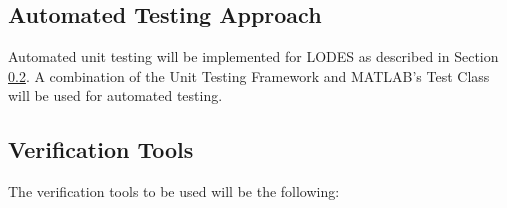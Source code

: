 \documentclass[12pt, titlepage]{article}
\newcommand{\famname}{LODES} %
\begin{document}
\subsection{Automated Testing Approach}
Automated unit testing will be implemented for \famname{} as described in Section \ref{sec_verificationtools}.
A combination of the Unit Testing Framework and MATLAB's Test Class will be used for automated testing.


\subsection{Verification Tools} \label{sec_verificationtools}
The verification tools to be used will be the following:
\end{document}
